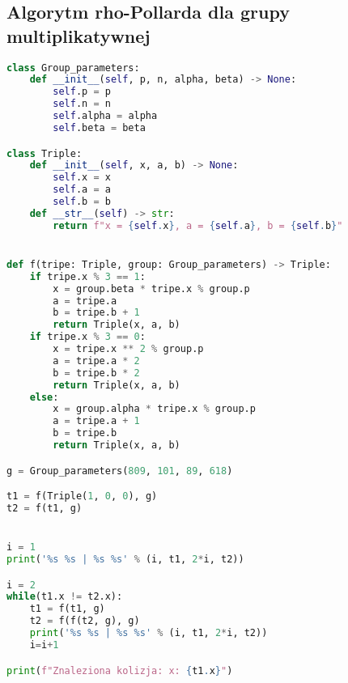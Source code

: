 \subsection{Algorytm rho-Pollarda dla grupy multiplikatywnej}
\begin{lstlisting}[language=python]
class Group_parameters:
    def __init__(self, p, n, alpha, beta) -> None:
        self.p = p
        self.n = n
        self.alpha = alpha
        self.beta = beta

class Triple:
    def __init__(self, x, a, b) -> None:
        self.x = x
        self.a = a
        self.b = b
    def __str__(self) -> str:
        return f"x = {self.x}, a = {self.a}, b = {self.b}"


def f(tripe: Triple, group: Group_parameters) -> Triple:
    if tripe.x % 3 == 1:
        x = group.beta * tripe.x % group.p
        a = tripe.a
        b = tripe.b + 1
        return Triple(x, a, b)
    if tripe.x % 3 == 0:
        x = tripe.x ** 2 % group.p
        a = tripe.a * 2
        b = tripe.b * 2
        return Triple(x, a, b)
    else:
        x = group.alpha * tripe.x % group.p
        a = tripe.a + 1
        b = tripe.b
        return Triple(x, a, b)

g = Group_parameters(809, 101, 89, 618)

t1 = f(Triple(1, 0, 0), g)
t2 = f(t1, g)


i = 1
print('%s %s | %s %s' % (i, t1, 2*i, t2))

i = 2
while(t1.x != t2.x):
    t1 = f(t1, g)
    t2 = f(f(t2, g), g)
    print('%s %s | %s %s' % (i, t1, 2*i, t2))
    i=i+1

print(f"Znaleziona kolizja: x: {t1.x}")
\end{lstlisting}

